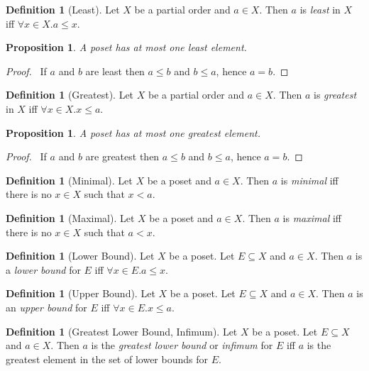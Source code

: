 \documentclass{report}
\let\qed\relax
\newtheorem{prop}[ax]{Proposition}
\theoremstyle{definition}
\newtheorem{df}[ax]{Definition}
\begin{document}
\begin{df}[Least]
Let $X$ be a partial order and $a \in X$. Then $a$ is \emph{least} in $X$ iff $\forall x \in X. a \leq x$.
\end{df}

\begin{prop}
A poset has at most one least element.
\end{prop}

\begin{proof}
\pf\ If $a$ and $b$ are least then $a \leq b$ and $b \leq a$, hence $a = b$. \qed
\end{proof}

\begin{df}[Greatest]
Let $X$ be a partial order and $a \in X$. Then $a$ is \emph{greatest} in $X$ iff $\forall x \in X. x \leq a$.
\end{df}

\begin{prop}
A poset has at most one greatest element.
\end{prop}

\begin{proof}
\pf\ If $a$ and $b$ are greatest then $a \leq b$ and $b \leq a$, hence $a = b$. \qed
\end{proof}

\begin{df}[Minimal]
Let $X$ be a poset and $a \in X$. Then $a$ is \emph{minimal} iff there is no $x \in X$ such that $x < a$.
\end{df}

\begin{df}[Maximal]
Let $X$ be a poset and $a \in X$. Then $a$ is \emph{maximal} iff there is no $x \in X$ such that $a < x$.
\end{df}

\begin{df}[Lower Bound]
Let $X$ be a poset. Let $E \subseteq X$ and $a \in X$. Then $a$ is a \emph{lower bound} for $E$ iff $\forall x \in E. a \leq x$.
\end{df}

\begin{df}[Upper Bound]
Let $X$ be a poset. Let $E \subseteq X$ and $a \in X$. Then $a$ is an \emph{upper bound} for $E$ iff $\forall x \in E. x \leq a$.
\end{df}

\begin{df}[Greatest Lower Bound, Infimum]
Let $X$ be a poset. Let $E \subseteq X$ and $a \in X$. Then $a$ is the \emph{greatest lower bound} or \emph{infimum} for $E$ iff $a$ is the greatest element in the set of lower bounds for $E$.
\end{df}
\end{document}

